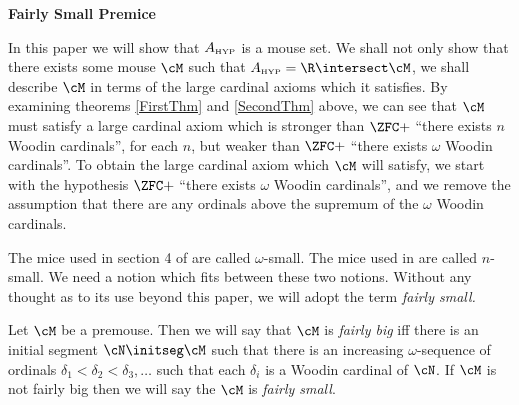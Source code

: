 \skipmed

\noindent
\textbf{Fairly Small Premice}

\skipsmall

In this paper we will show that $A_{\mbox{\tiny HYP}}$ is a mouse set.
We shall not only show that there exists some mouse $\cM$ such that
$\Ahyp=\R\intersect\cM$, we shall describe $\cM$ in terms
of the large cardinal axioms which it satisfies. By examining
theorems \ref{FirstThm} and \ref{SecondThm} above, we can see that
$\cM$ must satisfy a large cardinal axiom which is stronger than
$\ZFC + $ ``there exists $n$ Woodin cardinals'', for each $n$, but weaker
than $\ZFC + $ ``there exists $\omega$ Woodin cardinals''. To obtain
the large cardinal axiom which $\cM$ will satisfy, we start with the
hypothesis $\ZFC + $ ``there exists $\omega$ Woodin cardinals'', and
we remove the assumption that there are any ordinals above the
supremum of the $\omega$ Woodin cardinals.

The mice used in section 4 of \cite{Many_Woodins} are called $\omega$-small.
The mice used in \cite{Proj_WO_In_Mod} are called $n$-small.
We need a notion which fits between these two notions. Without any
thought as to its use beyond this paper, we will adopt the term
\emph{fairly small.}

\begin{definition}
Let $\cM$ be a premouse. Then we will say that $\cM$ is
\emph{fairly big} iff there is an initial segment
$\cN\initseg\cM$ such that there is an increasing
$\omega$-sequence of ordinals
$\delta_1< \delta_2< \delta_3,\dots$ such that each $\delta_i$
is a Woodin cardinal of $\cN$. If $\cM$ is not fairly big then
we will say the $\cM$ is \emph{fairly small}.
\end{definition}
